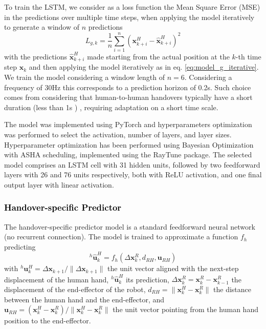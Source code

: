 \documentclass[lettersize,journal]{IEEEtran}
\newcommand{\x}{\bm x}
\begin{document}
To train the LSTM, we consider as a loss function the Mean Square Error (MSE) in the predictions over multiple time steps, when applying the model iteratively to generate a window of $n$ predictions
\begin{equation}
    L_{g,k} = \frac{1}{n}\sum_{i=1}^n (\x^H_{k+i} - \hat{\x}^H_{k+i})^2
\end{equation}
with the predictions $\hat{\x}^H_{k+i}$ made starting from the actual position at the $k$-th time step $\x_k$ and then applying the model iteratively as in eq. \ref{eq:model_g_iterative}.
We train the model considering a window length of $n=6$.
Considering a frequency of 30Hz this corresponds to a prediction horizon of 0.2s.
Such choice comes from considering that human-to-human handovers typically have a short duration (less than 1s ) \cite{shibata_experimental_1995}, requiring adaptation on a short time scale. 

The model was implemented using PyTorch and hyperparameters optimization was performed to select the activation, number of layers, and layer sizes. Hyperparameter optimization has been performed using Bayesian Optimization with ASHA scheduling, implemented using the RayTune package.
The selected model comprises an LSTM cell with 31 hidden units, followed by two feedforward layers with 26 and 76 units respectively, both with ReLU activation, and one final output layer with linear activation. 


\subsubsection{\textcolor{black}{Handover-specific Predictor}}

\noindent
The handover-specific predictor model is a standard feedforward neural network (no recurrent connection).
The model is trained to approximate a function $f_h$ predicting 
\begin{equation}
    {}^h\hat{\bm u}^H_k = f_h(\Delta \x_k^R, d_{RH}, {\bm u}_{RH})
\end{equation}
with ${}^h{\bm u}^H_k = \Delta\x_{k+1}/\|\Delta\x_{k+1}\|$ the unit vector aligned with the next-step displacement of the human hand, ${}^h\hat{\bm u}^H_k$ its prediction, $\Delta \x_k^R = \x_k^R - \x_{k-1}^R$ the displacement of the end-effector of the robot, $d_{RH} = \|\x_k^H - \x_k^R\|$ the distance between the human hand and the end-effector, and ${\bm u}_{RH} = (\x_k^H - \x_k^R) / \|\x_k^H - \x_k^R\|$ the unit vector pointing from the human hand position to the end-effector.
\end{document}
